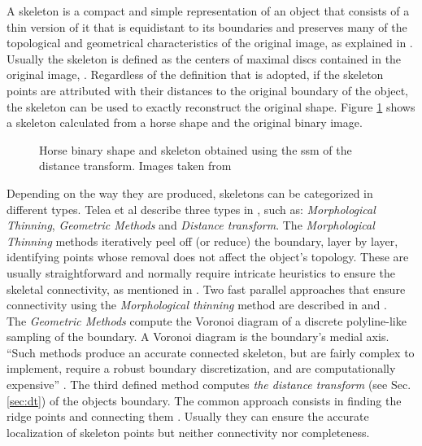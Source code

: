 A skeleton is a compact and simple representation of an object that consists of a thin
version of it that is equidistant to its boundaries and preserves many of
the topological and geometrical characteristics of the original image, as explained in
\cite{wikipedia:skeleton,ssm,augmented}. Usually the skeleton is defined as the centers
of maximal discs contained in the original image, \cite{ssm,augmented}.
Regardless of the definition that is adopted, if the skeleton points are attributed with their distances
to the original boundary of the object, the skeleton can be used to exactly 
reconstruct the original shape. Figure \ref{fig:genskeleton} shows a skeleton calculated
from a horse shape and the original binary image.\\

\begin{figure}[h t b p ! H]
  \centering
\qquad
  \caption{Horse binary shape and skeleton obtained using the ssm of the distance transform. Images taken from \cite{ssm}}
  \label{fig:genskeleton}
\end{figure}


Depending on the way they are produced, skeletons can be categorized in different types.
Telea et al describe three types in \cite{augmented}, such as: \emph{Morphological Thinning},
\emph{Geometric Methods} and \emph{Distance transform}. The \emph{Morphological Thinning} methods iteratively peel off (or reduce) the boundary, layer by layer, identifying
points whose removal does not affect the object's topology. These are usually 
straightforward and normally require intricate heuristics to ensure the skeletal
connectivity, as mentioned in \cite{augmented}. Two fast parallel approaches that
ensure connectivity using the \emph{Morphological thinning} method are described
in \cite{onepass} and \cite{thinning}.\\
The \emph{Geometric Methods} compute the Voronoi diagram of a discrete polyline-like
sampling of the boundary. A Voronoi diagram is the boundary's medial axis. ``Such 
methods produce an accurate connected skeleton, but are fairly complex to implement,
require a robust boundary discretization, and are computationally expensive''
\cite[p.251]{augmented}. The third defined method computes \emph{the distance transform}
(see Sec. \ref{sec:dt}) of the objects boundary. The common approach consists in
finding the ridge points and connecting them \cite{maxima,euclideancentre,ridgedt}.
 Usually they can ensure the accurate localization of skeleton points 
but neither connectivity nor completeness.\\

